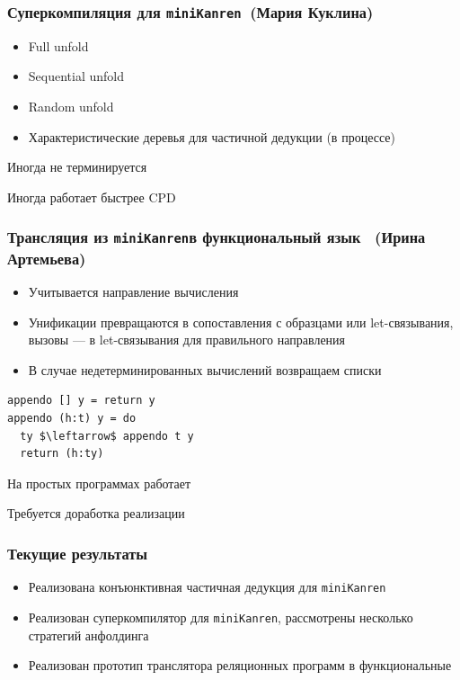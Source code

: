 \documentclass{beamer}
\newcommand{\miniKanren}{\texttt{miniKanren}}
\begin{document}
\begin{frame}[fragile]
  \transwipe[direction=90]
  \frametitle{Суперкомпиляция для \miniKanren \ (Мария Куклина)}

\begin{itemize}
  \item Full unfold 
  \item Sequential unfold
  \item Random unfold 
  \item Характеристические деревья для частичной дедукции (в процессе)
\end{itemize}

\vfill

\begin{center}
  Иногда не терминируется
  
  Иногда работает быстрее CPD 
\end{center}

\end{frame}

\begin{frame}[fragile]
  \transwipe[direction=90]
  \frametitle{Трансляция из \miniKanren в функциональный язык \ (Ирина Артемьева)}

\begin{itemize}
  \item Учитывается направление вычисления
  \item Унификации превращаются в сопоставления с образцами или let-связывания, вызовы --- в let-связывания для правильного направления
  \item В случае недетерминированных вычислений возвращаем списки
\end{itemize}

\begin{center}
  \begin{minipage}{4.2cm}
  \begin{lstlisting}[frame=single]  
appendo [] y = return y 
appendo (h:t) y = do 
  ty $\leftarrow$ appendo t y
  return (h:ty)
  \end{lstlisting}
  \end{minipage}
  \end{center}

\begin{center}
  На простых программах работает

  Требуется доработка реализации
\end{center}
\end{frame}

\begin{frame}[fragile]
  \transwipe[direction=90]
  \frametitle{Текущие результаты}
\begin{itemize}
  \item Реализована конъюнктивная частичная дедукция для \miniKanren 
  \item Реализован суперкомпилятор для \miniKanren, рассмотрены несколько стратегий анфолдинга
  \item Реализован прототип транслятора реляционных программ в функциональные 
\end{itemize}
\end{frame}
\end{document}
